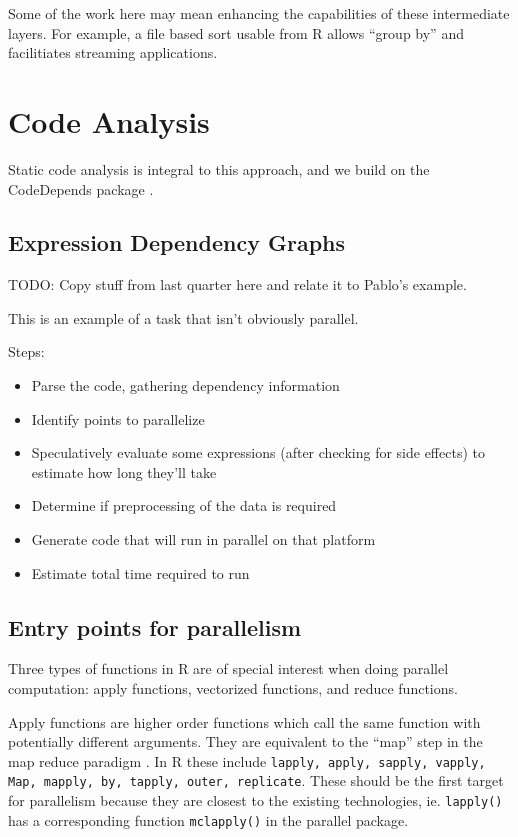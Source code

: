 \documentclass[12pt]{article}
\begin{document}
Some of the work here may mean enhancing the capabilities of these
intermediate layers. For example, a file based sort usable from R allows
``group by'' and facilitiates streaming applications.

\section{Code Analysis}

Static code analysis is integral to this approach, and we build on the 
CodeDepends package \cite{R-CodeDepends}.

\subsection{Expression Dependency Graphs}

TODO: Copy stuff from last quarter here and relate it to Pablo's example.

This is an example of a task that isn't obviously parallel.

Steps:

\begin{itemize}
    \item Parse the code, gathering dependency information
    \item Identify points to parallelize
    \item Speculatively evaluate some expressions (after checking for side
        effects) to estimate how long they'll
        take
    \item Determine if preprocessing of the data is required
    \item Generate code that will run in parallel on that platform
    \item Estimate total time required to run
\end{itemize}

\subsection{Entry points for parallelism}

Three types of functions in R are of special interest when doing parallel
computation: apply functions, vectorized functions, and reduce functions.

Apply functions are higher order functions which call the same function
with potentially different arguments. They are equivalent to the ``map''
step in the map reduce paradigm \cite{dean2008mapreduce}.  In R these
include \texttt{lapply, apply, sapply, vapply, Map, mapply, by, tapply,
outer, replicate}. These should be the first target for parallelism because
they are closest to the existing technologies, ie. \texttt{lapply()} has a
corresponding function \texttt{mclapply()} in the parallel package.
\end{document}
